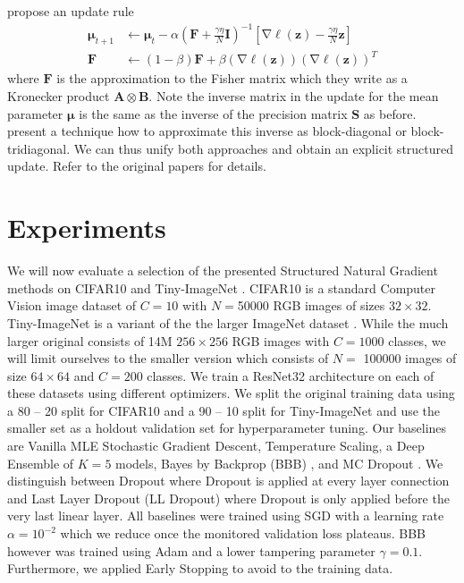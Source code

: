 \documentclass[a4paper, 11pt, oneside]{scrartcl}
\theoremstyle{break}
\DeclareMathOperator{\grad}{\nabla}
\newcommand{\matr}[1]{\boldsymbol{#1}}
\numberwithin{equation}{section}
\begin{document}
			\parencite{ZSD+17} propose an update rule 
			\begin{equation*}
				\begin{aligned}
					\matr{\mu}_{t+1} &\leftarrow \matr{\mu}_t - \alpha \left( \matr{F} + \frac{\gamma \eta}{N} \matr{I} \right)^{-1} \left[ \grad \ell(\matr{z}) - \frac{\gamma \eta}{N} \matr{z} \right] \\
					\matr{F} &\leftarrow (1 - \beta) \matr{F} + \beta (\grad \ell(\matr{z})) (\grad \ell(\matr{z}))^T
				\end{aligned}
			\end{equation*}
			where $\matr{F}$ is the approximation to the Fisher matrix which they write as a Kronecker product $\matr{A} \otimes \matr{B}$. 
			Note the inverse matrix in the update for the mean parameter $\matr{\mu}$ is the same as the inverse of the precision matrix $\matr{S}$ as before. 
			\parencite{MG15} present a technique how to approximate this inverse as block-diagonal or block-tridiagonal. 
			We can thus unify both approaches and obtain an explicit structured update. 
			Refer to the original papers for details.

	\section{Experiments}
		We will now evaluate a selection of the presented Structured Natural Gradient methods on CIFAR10 \parencite{KH+09} and Tiny-ImageNet \parencite{LY15}. 
		CIFAR10 is a standard Computer Vision image dataset of $C = 10$ with $N = $\num[group-separator={,}]{50000} RGB images of sizes $32 \times 32$.
		Tiny-ImageNet is a variant of the the larger ImageNet dataset \parencite{DDS+09}.
		While the much larger original consists of 14M $256 \times 256$ RGB images with $C = 1000$ classes, we will limit ourselves to the smaller version which consists of $N = $ \num[group-separator={,}]{100000} images of size $64 \times 64$ and $C = 200$ classes.
		We train a ResNet32 architecture \parencite{HZR+15, I18}on each of these datasets using different optimizers.
		We split the original training data using a 80 -- 20 split for CIFAR10 and a 90 -- 10 split for Tiny-ImageNet and use the smaller set as a holdout validation set for hyperparameter tuning. 
		Our baselines are Vanilla MLE Stochastic Gradient Descent, Temperature Scaling, a Deep Ensemble of $K = 5$ models, Bayes by Backprop (BBB) \parencite{BCK+15, KES22}, and MC Dropout \parencite{GG15}.
		We distinguish between Dropout where Dropout is applied at every layer connection and Last Layer Dropout (LL Dropout) where Dropout is only applied before the very last linear layer. 
		All baselines were trained using SGD with a learning rate $\alpha = 10^{-2}$ which we reduce once the monitored validation loss plateaus. 
		BBB however was trained using Adam and a lower tampering parameter $\gamma = 0.1$.
		Furthermore, we applied Early Stopping to avoid to the training data. 
\end{document}
